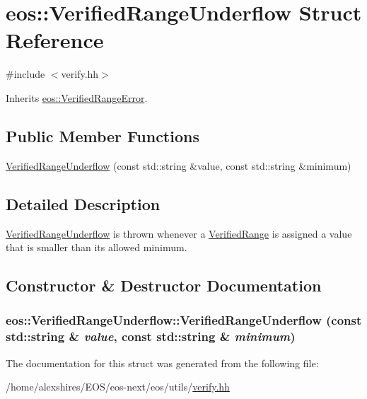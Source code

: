 \hypertarget{structeos_1_1VerifiedRangeUnderflow}{
\section{eos::VerifiedRangeUnderflow Struct Reference}
\label{structeos_1_1VerifiedRangeUnderflow}
}


{\ttfamily \#include $<$verify.hh$>$}

Inherits \hyperlink{classeos_1_1VerifiedRangeError}{eos::VerifiedRangeError}.\subsection*{Public Member Functions}
\begin{DoxyCompactItemize}
\item 
\hyperlink{structeos_1_1VerifiedRangeUnderflow_afdef24e4219176e493e51ecae0f1224a}{VerifiedRangeUnderflow} (const std::string \&value, const std::string \&minimum)
\end{DoxyCompactItemize}


\subsection{Detailed Description}
\hyperlink{structeos_1_1VerifiedRangeUnderflow}{VerifiedRangeUnderflow} is thrown whenever a \hyperlink{classeos_1_1VerifiedRange}{VerifiedRange} is assigned a value that is smaller than its allowed minimum. 

\subsection{Constructor \& Destructor Documentation}
\hypertarget{structeos_1_1VerifiedRangeUnderflow_afdef24e4219176e493e51ecae0f1224a}{
\subsubsection[{VerifiedRangeUnderflow}]{\setlength{\rightskip}{0pt plus 5cm}eos::VerifiedRangeUnderflow::VerifiedRangeUnderflow (const std::string \& {\em value}, \/  const std::string \& {\em minimum})}}
\label{structeos_1_1VerifiedRangeUnderflow_afdef24e4219176e493e51ecae0f1224a}


The documentation for this struct was generated from the following file:\begin{DoxyCompactItemize}
\item 
/home/alexshires/EOS/eos-\/next/eos/utils/\hyperlink{verify_8hh}{verify.hh}\end{DoxyCompactItemize}
